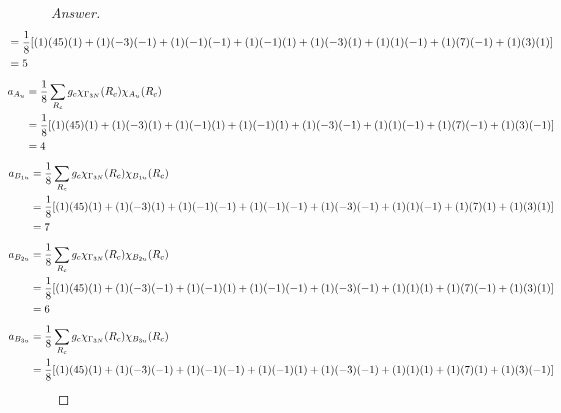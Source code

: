 \documentclass[../psets.tex]{subfiles}
\begin{document}
\begin{enumerate}[label={\Roman*)}]
\begin{enumerate}[label={\alph*)}]
\begin{proof}[Answer]
\begin{align*}
                \hspace{-4em}&= \frac{1}{8}[(1)(45)(1)+(1)(-3)(-1)+(1)(-1)(-1)+(1)(-1)(1)+(1)(-3)(1)+(1)(1)(-1)+(1)(7)(-1)+(1)(3)(1)]\\
                \hspace{-4em}&= 5
            \end{align*}
            \begin{align*}
                \hspace{-4em}a_{A_u}    &= \frac{1}{8}\sum_{R_c}g_c\chi_{\Gamma_{3N}}(R_c)\chi_{A_u}(R_c)\\
                \hspace{-4em}&= \frac{1}{8}[(1)(45)(1)+(1)(-3)(1)+(1)(-1)(1)+(1)(-1)(1)+(1)(-3)(-1)+(1)(1)(-1)+(1)(7)(-1)+(1)(3)(-1)]\\
                \hspace{-4em}&= 4
            \end{align*}
            \begin{align*}
                \hspace{-4em}a_{B_{1u}} &= \frac{1}{8}\sum_{R_c}g_c\chi_{\Gamma_{3N}}(R_c)\chi_{B_{1u}}(R_c)\\
                \hspace{-4em}&= \frac{1}{8}[(1)(45)(1)+(1)(-3)(1)+(1)(-1)(-1)+(1)(-1)(-1)+(1)(-3)(-1)+(1)(1)(-1)+(1)(7)(1)+(1)(3)(1)]\\
                \hspace{-4em}&= 7
            \end{align*}
            \begin{align*}
                \hspace{-4em}a_{B_{2u}} &= \frac{1}{8}\sum_{R_c}g_c\chi_{\Gamma_{3N}}(R_c)\chi_{B_{2u}}(R_c)\\
                \hspace{-4em}&= \frac{1}{8}[(1)(45)(1)+(1)(-3)(-1)+(1)(-1)(1)+(1)(-1)(-1)+(1)(-3)(-1)+(1)(1)(1)+(1)(7)(-1)+(1)(3)(1)]\\
                \hspace{-4em}&= 6
            \end{align*}
            \begin{align*}
                \hspace{-4em}a_{B_{3u}} &= \frac{1}{8}\sum_{R_c}g_c\chi_{\Gamma_{3N}}(R_c)\chi_{B_{3u}}(R_c)\\
                \hspace{-4em}&= \frac{1}{8}[(1)(45)(1)+(1)(-3)(-1)+(1)(-1)(-1)+(1)(-1)(1)+(1)(-3)(-1)+(1)(1)(1)+(1)(7)(1)+(1)(3)(-1)]\\

\end{align*}
\end{proof}
\end{enumerate}
\end{enumerate}
\end{document}
